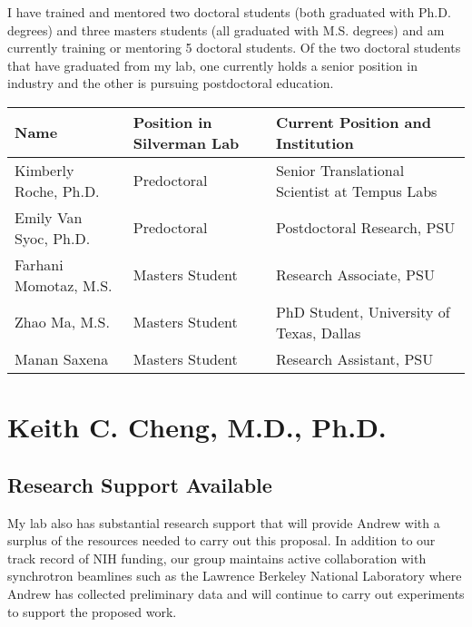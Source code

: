 \documentclass{NIHGrant}
\begin{document}
I have trained and mentored two doctoral students (both graduated with Ph.D. degrees) and three masters students (all graduated with M.S. degrees) and am currently training or mentoring 5 doctoral students. Of the two doctoral students that have graduated from my lab, one currently holds a senior position in industry and the other is pursuing postdoctoral education. 

\begin{center}
\renewcommand{\arraystretch}{1.3}
  \fontsize{9pt}{9pt}\selectfont
  \begin{tabular}{| l | p{2in} | p{3in} |}
    \hline
    \textbf{Name} & \textbf{Position in Silverman Lab} & \textbf{Current Position and Institution} \\
    \hline
    Kimberly Roche, Ph.D. & Predoctoral & Senior Translational Scientist at Tempus Labs \\
    \hline
    Emily Van Syoc, Ph.D. & Predoctoral &  Postdoctoral Research, PSU \\
    \hline
    Farhani Momotaz, M.S. & Masters Student & Research Associate, PSU \\
    \hline 
    Zhao Ma, M.S. & Masters Student & PhD Student, University of Texas, Dallas \\
    \hline
    Manan Saxena & Masters Student & Research Assistant, PSU\\
    \hline
  \end{tabular}

\end{center}

\section*{Keith C. Cheng, M.D., Ph.D. }

\subsection*{Research Support Available}

My lab also has substantial research support that will provide Andrew with a surplus of the resources needed to carry out this proposal. In addition to our track record of NIH funding, our group maintains active collaboration with synchrotron beamlines such as the Lawrence Berkeley National Laboratory where Andrew has collected preliminary data and will continue to carry out experiments to support the proposed work.
\end{document}
